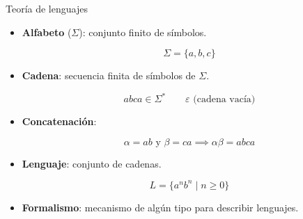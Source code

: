 \documentclass{beamer}
\begin{document}
\begin{frame}{Teoría de lenguajes}

    \pause

    \begin{itemize}

        \item \textbf{Alfabeto} ($\Sigma$):
              conjunto finito de símbolos.

              $$
                  \Sigma=\{a,b,c\}
              $$

              \pause

        \item \textbf{Cadena}:
              secuencia finita de símbolos de $\Sigma$.

              $$
                  abca \in \Sigma^*
                  \qquad
                  \varepsilon \text{ (cadena vacía)}
              $$

              \pause

        \item \textbf{Concatenación}:

              $$
                  \alpha = ab \text{ y } \beta = ca \implies \alpha\beta = abca
              $$

              \pause

        \item \textbf{Lenguaje}:
              conjunto de cadenas.

              $$
                  L=\{a^n b^n \mid n \ge 0\}
              $$

              \pause

        \item \textbf{Formalismo}:
              mecanismo de algún tipo para describir lenguajes.

    \end{itemize}

\end{frame}
\end{document}
